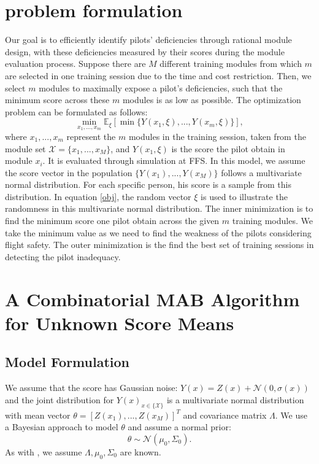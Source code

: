 \documentclass[opre,sglanonrev]{informs4}
\begin{document}
\section{problem formulation}
\label{problem formulation}
Our goal is to efficiently identify pilots’ deficiencies through rational module design, with these deficiencies measured by their scores during the module evaluation process. Suppose there are $M$ different training modules from which $m$ are selected in one training session due to the time and cost restriction. Then, we select $m$ modules to maximally expose a pilot’s deficiencies, such that the minimum score across these $m$ modules is as low as possible. The optimization problem can be formulated as follows:
\begin{equation}
	\min_{x_1,...,x_m} \mathbb{E}_\xi[\min\{Y(x_1,\xi),...,Y(x_m,\xi) \} ], 
	\label{obj}
\end{equation}
where $x_1,...,x_m$ represent the $m$ modules in the training session, taken from the module set $\mathcal{X} = \{x_1,...,x_M\}$, and $Y(x_1,\xi)$ is the score the pilot obtain in module $x_i$. It is evaluated through simulation at FFS. In this model, we assume the score vector in the population $\{Y(x_1),...,Y(x_M)\}$ follows a multivariate normal distribution. For each specific person, his score is a sample from this distribution. In equation \eqref{obj}, the random vector $\xi$ is used to illustrate the randomness in this multivariate normal distribution. The inner minimization is to find the minimum score one pilot obtain across the given $m$ training modules. We take the minimum value as we need to find the weakness of the pilots considering flight safety. The outer minimization is the find the best set of training sessions in detecting the pilot inadequacy.

\section{A Combinatorial MAB Algorithm for Unknown Score Means}
\label{BCUCB}
\subsection{Model Formulation}
We assume that the score has Gaussian noise: $Y(x) = Z(x) + \mathcal{N}(0,\sigma(x))$ and the joint distribution for $Y(x)_{x\in\{\mathcal{X}\}}$ is a multivariate normal distribution with mean vector $\theta = [Z(x_1),...,Z(x_M)]^T$ and covariance matrix $\Lambda$. We use a Bayesian approach to model $\theta$ and assume a normal prior:
$$\theta \sim \mathcal{N}(\mu_0, \Sigma_0). $$
As with \cite{xie2016bayesian}, we assume $\Lambda, \mu_0, \Sigma_0$ are known.
\end{document}
